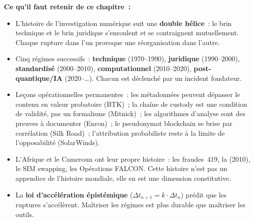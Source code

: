 \begin{boxresume}
\textbf{Ce qu'il faut retenir de ce chapitre~:}

\begin{itemize}
    \item L'histoire de l'investigation numérique suit une
          \textbf{double hélice}~: le brin technique et le brin juridique
          s'enroulent et se contraignent mutuellement. Chaque rupture dans
          l'un provoque une réorganisation dans l'autre.

    \item Cinq régimes successifs~: \textbf{technique} (1970--1990),
          \textbf{juridique} (1990--2000), \textbf{standardisé} (2000--2010),
          \textbf{computationnel} (2010--2020), \textbf{post-quantique/IA}
          (2020--\ldots). Chacun est déclenché par un incident fondateur.

    \item Leçons opérationnelles permanentes~: les métadonnées peuvent
          dépasser le contenu en valeur probatoire (BTK)~; la chaîne de
          custody est une condition de validité, pas un formalisme
          (Mitnick)~; les algorithmes d'analyse sont des preuves à documenter
          (Enron)~; le pseudonymat blockchain se brise par corrélation
          (Silk Road)~; l'attribution probabiliste reste à la limite de
          l'opposabilité (SolarWinds).

    \item L'Afrique et le Cameroun ont leur propre histoire~: les fraudes~419,
          la  (2010), le SIM swapping, les Opérations FALCON.
          Cette histoire n'est pas un appendice de l'histoire mondiale, elle
          en est une dimension constitutive.

    \item La \textbf{loi d'accélération épistémique}
          ($\Delta t_{n+1} = k \cdot \Delta t_n$) prédit que les ruptures
          s'accélèrent. Maîtriser les régimes est plus durable que maîtriser
          les outils.
\end{itemize}
\end{boxresume}

\bigskip


